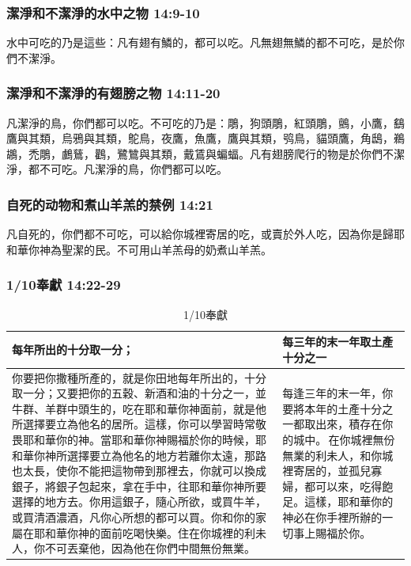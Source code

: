 \subsubsection{潔淨和不潔淨的水中之物 14:9-10}
水中可吃的乃是這些：凡有翅有鱗的，都可以吃。凡無翅無鱗的都不可吃，是於你們不潔淨。

\subsubsection{潔淨和不潔淨的有翅膀之物 14:11-20}
凡潔淨的鳥，你們都可以吃。不可吃的乃是：鵰，狗頭鵰，紅頭鵰，鸇，小鷹，鷂鷹與其類，烏鴉與其類，鴕鳥，夜鷹，魚鷹，鷹與其類，鸮鳥，貓頭鷹，角鴟，鵜鶘，禿鵰，鸕鶿，鸛，鷺鷥與其類，戴鵀與蝙蝠。凡有翅膀爬行的物是於你們不潔淨，都不可吃。凡潔淨的鳥，你們都可以吃。

\subsubsection{自死的动物和煮山羊羔的禁例 14:21}
凡自死的，你們都不可吃，可以給你城裡寄居的吃，或賣於外人吃，因為你是歸耶和華你神為聖潔的民。不可用山羊羔母的奶煮山羊羔。


\subsubsection{1/10奉獻 14:22-29}
\begin{table}[H]
\begin{center}
\begin{tabular}{ p{12cm}|p{5cm} } \toprule
每年所出的十分取一分；&每三年的末一年取土產十分之一 \\\hline
你要把你撒種所產的，就是你田地每年所出的，十分取一分；又要把你的五穀、新酒和油的十分之一，並牛群、羊群中頭生的，吃在耶和華你神面前，就是他所選擇要立為他名的居所。這樣，你可以學習時常敬畏耶和華你的神。當耶和華你神賜福於你的時候，耶和華你神所選擇要立為他名的地方若離你太遠，那路也太長，使你不能把這物帶到那裡去，你就可以換成銀子，將銀子包起來，拿在手中，往耶和華你神所要選擇的地方去。你用這銀子，隨心所欲，或買牛羊，或買清酒濃酒，凡你心所想的都可以買。你和你的家屬在耶和華你神的面前吃喝快樂。住在你城裡的利未人，你不可丟棄他，因為他在你們中間無份無業。&每逢三年的末一年，你要將本年的土產十分之一都取出來，積存在你的城中。 在你城裡無份無業的利未人，和你城裡寄居的，並孤兒寡婦，都可以來，吃得飽足。這樣，耶和華你的神必在你手裡所辦的一切事上賜福於你。 \\\hline
\end{tabular}
\end{center}
\caption{1/10奉獻}
\end{table}

